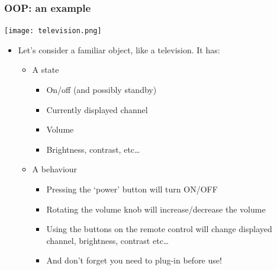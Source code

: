 \documentclass[9pt]{beamer}
\begin{document}
\begin{frame}
  \frametitle{OOP: an example}
  \centering\texttt{[image: television.png]}
  
  \medskip
  
  \begin{itemize}
  \item Let's consider a familiar object, like a television. It has:
    \smallskip
    \begin{itemize}
    \item A state
      \begin{itemize}
      \item On/off (and possibly standby)
      \item Currently displayed channel
      \item Volume
      \item Brightness, contrast, etc\dots
      \end{itemize}

    \medskip
    
    \item A behaviour
      \smallskip
      \begin{itemize}
      \item Pressing the `power' button will turn ON/OFF
      \item Rotating the volume knob will increase/decrease the volume
      \item Using the buttons on the remote control will change displayed 
            channel, brightness, contrast etc\dots
      \item And don't forget you need to plug-in before use!
      \end{itemize}
    \end{itemize}
  \end{itemize}

\end{frame}
\end{document}
